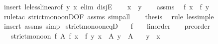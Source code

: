 \begin{isabellebody}
%
\isadelimproof
%
\endisadelimproof
%
\isatagproof
{}\isamarkupfalse%
\ {\isacharparenleft}{\kern0pt}insert\ le{\isacharunderscore}{\kern0pt}less{\isacharunderscore}{\kern0pt}linear{\isacharbrackleft}{\kern0pt}of\ y\ x{\isacharbrackright}{\kern0pt}{\isacharcomma}{\kern0pt}\ elim\ disjE{\isacharparenright}{\kern0pt}\isanewline
\ \ \isamarkupfalse%
\ {\isachardoublequoteopen}x\ {\isacharless}{\kern0pt}\ y{\isachardoublequoteclose}\isanewline
\ \ \isamarkupfalse%
\ assms\ \isamarkupfalse%
\ {\isachardoublequoteopen}f\ x\ {\isacharless}{\kern0pt}\ f\ y{\isachardoublequoteclose}\ \isamarkupfalse%
\ {\isacharparenleft}{\kern0pt}rule{\isacharunderscore}{\kern0pt}tac\ strict{\isacharunderscore}{\kern0pt}mono{\isacharunderscore}{\kern0pt}onD{\isacharbrackleft}{\kern0pt}OF\ assms{\isacharparenleft}{\kern0pt}{}{\isacharparenright}{\kern0pt}{\isacharbrackright}{\kern0pt}{\isacharparenright}{\kern0pt}\ simp{\isacharunderscore}{\kern0pt}all\isanewline
\ \ \isamarkupfalse%
\ {\isacharquery}{\kern0pt}thesis\ \isamarkupfalse%
\ {\isacharparenleft}{\kern0pt}rule\ less{\isacharunderscore}{\kern0pt}imp{\isacharunderscore}{\kern0pt}le{\isacharparenright}{\kern0pt}\isanewline
{}\isamarkupfalse%
\ {\isacharparenleft}{\kern0pt}insert\ assms{\isacharcomma}{\kern0pt}\ simp{\isacharparenright}{\kern0pt}%
\endisatagproof
{\isafoldproof}%
%
\isadelimproof
\isanewline
%
\endisadelimproof
\isanewline
{}\isamarkupfalse%
\ strict{\isacharunderscore}{\kern0pt}mono{\isacharunderscore}{\kern0pt}on{\isacharunderscore}{\kern0pt}eqD{\isacharcolon}{\kern0pt}\isanewline
\ \ \ f\ {\isacharcolon}{\kern0pt}{\isacharcolon}{\kern0pt}\ {\isachardoublequoteopen}{\isacharparenleft}{\kern0pt}{\isacharunderscore}{\kern0pt}\ {\isacharcolon}{\kern0pt}{\isacharcolon}{\kern0pt}\ linorder{\isacharparenright}{\kern0pt}\ {\isasymRightarrow}\ {\isacharparenleft}{\kern0pt}{\isacharunderscore}{\kern0pt}\ {\isacharcolon}{\kern0pt}{\isacharcolon}{\kern0pt}\ preorder{\isacharparenright}{\kern0pt}{\isachardoublequoteclose}\isanewline
\ \ \ {\isachardoublequoteopen}strict{\isacharunderscore}{\kern0pt}mono{\isacharunderscore}{\kern0pt}on\ f\ A{\isachardoublequoteclose}\ {\isachardoublequoteopen}f\ x\ {\isacharequal}{\kern0pt}\ f\ y{\isachardoublequoteclose}\ {\isachardoublequoteopen}x\ {\isasymin}\ A{\isachardoublequoteclose}\ {\isachardoublequoteopen}y\ {\isasymin}\ A{\isachardoublequoteclose}\isanewline
\ \ \ {\isachardoublequoteopen}y\ {\isacharequal}{\kern0pt}\ x{\isachardoublequoteclose}\isanewline

\end{isabellebody}

